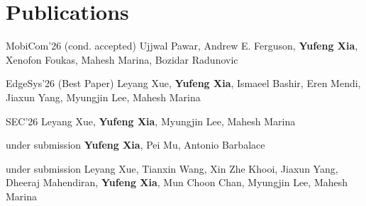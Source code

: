 \section{Publications}
\vspace{2pt}

  {MobiCom'26 (cond. accepted)}
  {Ujjwal Pawar, Andrew E. Ferguson, \textbf{Yufeng Xia}, Xenofon Foukas, Mahesh Marina, Bozidar Radunovic}

  {EdgeSys'26 (Best Paper)}
  {Leyang Xue, \textbf{Yufeng Xia}, Ismaeel Bashir, Eren Mendi, Jiaxun Yang, Myungjin Lee, Mahesh Marina}

  {SEC'26}
  {Leyang Xue, \textbf{Yufeng Xia}, Myungjin Lee, Mahesh Marina}

  {under submission}
  {\textbf{Yufeng Xia}, Pei Mu, Antonio Barbalace}

  {under submission}
  {Leyang Xue, Tianxin Wang, Xin Zhe Khooi, Jiaxun Yang, Dheeraj Mahendiran, \textbf{Yufeng Xia}, Mun Choon Chan, Myungjin Lee, Mahesh Marina}
